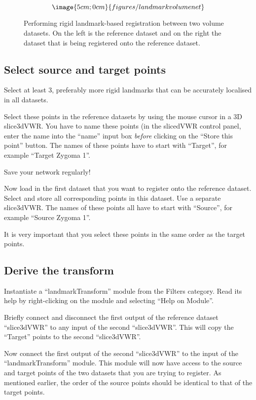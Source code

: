 \begin{figure}
$$\image{5cm;0cm}{figures/landmarkvolumenet}$$
\caption{Performing rigid landmark-based registration between two volume 
datasets.  On the left is the reference dataset and on the right the 
dataset that is being registered onto the reference dataset.}\label{figLMVN}
\end{figure}

\subsection{Select source and target points}
Select at least 3, preferably more rigid landmarks that can be
accurately localised in all datasets.

Select these points in the reference datasets by using the mouse
cursor in a 3D slice3dVWR.  You have to name these points (in the
slicedVWR control panel, enter the name into the ``name'' input box
{\em before} clicking on the ``Store this point'' button.  The names
of these points have to start with ``Target'', for example ``Target
Zygoma 1''.

Save your network regularly!

Now load in the first dataset that you want to register onto the
reference dataset.  Select and store all corresponding points in this
dataset.  Use a separate slice3dVWR.  The names of these points all
have to start with ``Source'', for example ``Source Zygoma 1''.

It is very important that you select these points in the same order as
the target points.

\subsection{Derive the transform}
Instantiate a ``landmarkTransform'' module from the Filters category.
Read its help by right-clicking on the module and selecting ``Help on
Module''.

Briefly connect and disconnect the first output of the reference
dataset ``slice3dVWR'' to any input of the second ``slice3dVWR''.
This will copy the ``Target'' points to the second ``slice3dVWR''.

Now connect the first output of the second ``slice3dVWR'' to the input
of the ``landmarkTransform'' module.  This module will now have access
to the source and target points of the two datasets that you are
trying to register.  As mentioned earlier, the order of the source
points should be identical to that of the target points.

